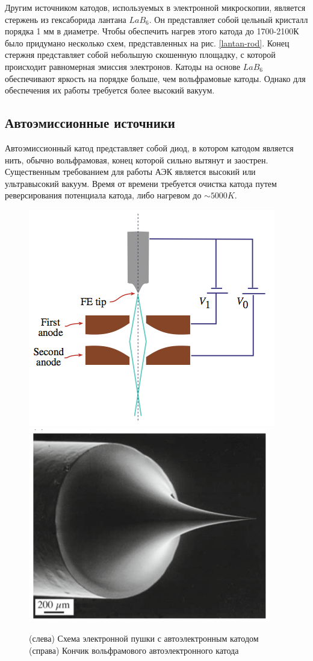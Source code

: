 \documentclass[12pt]{article}
\begin{document}
Другим источником катодов, используемых в электронной микроскопии, является стержень из гексаборида лантана $LaB_6$. Он представляет собой цельный кристалл порядка 1 мм в диаметре. Чтобы обеспечить нагрев этого катода до 1700-2100К было придумано несколько схем, представленных на рис. \ref{lantan-rod}. Конец стержня представляет собой небольшую скошенную площадку, с которой происходит равномерная эмиссия электронов. Катоды на основе $LaB_6$ обеспечивают яркость на порядке больше, чем вольфрамовые катоды. Однако для обеспечения их работы требуется более высокий вакуум.

\clearpage
\subsection*{Автоэмиссионные источники}

Автоэмиссионный катод представляет собой диод, в котором катодом является нить, обычно вольфрамовая, конец которой сильно вытянут и заострен. Существенным требованием для работы АЭК является высокий или ультравысокий вакуум. Время от времени требуется очистка катода путем реверсирования потенциала катода, либо нагревом до $\sim 5000 K$.

\begin{figure}[!ht]
\includegraphics[width=0.5\linewidth]{pictures/feg1.png}
\includegraphics[width=0.5\linewidth]{pictures/feg2.png}
\caption{(слева) Схема электронной пушки с автоэлектронным катодом (справа) Кончик вольфрамового  автоэлектронного катода}
\end{figure}
\end{document}
